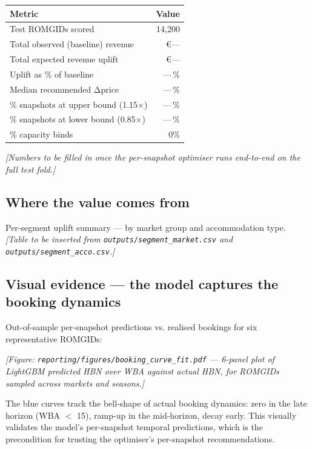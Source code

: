 \documentclass[11pt,a4paper]{article}
\begin{document}
\begin{center}
\small
\begin{tabular}{@{}lr@{}}
\toprule
\textbf{Metric} & \textbf{Value} \\
\midrule
Test ROMGIDs scored & 14{,}200 \\
Total observed (baseline) revenue & \euro{}--- \\
Total expected revenue uplift & \euro{}--- \\
Uplift as \% of baseline & ---\,\% \\
Median recommended Δprice & ---\,\% \\
\% snapshots at upper bound (1.15$\times$) & ---\,\% \\
\% snapshots at lower bound (0.85$\times$) & ---\,\% \\
\% capacity binds & 0\% \\
\bottomrule
\end{tabular}
\end{center}

\noindent\emph{[Numbers to be filled in once the per-snapshot optimiser runs end-to-end on the full test fold.]}

\subsection{Where the value comes from}

Per-segment uplift summary --- by market group and accommodation type. \emph{[Table to be inserted from \texttt{outputs/segment\_market.csv} and \texttt{outputs/segment\_acco.csv}.]}

\subsection{Visual evidence — the model captures the booking dynamics}

Out-of-sample per-snapshot predictions vs. realised bookings for six representative ROMGIDs:

\begin{center}
  \emph{[Figure: \texttt{reporting/figures/booking\_curve\_fit.pdf} --- 6-panel plot of LightGBM predicted HBN over WBA against actual HBN, for ROMGIDs sampled across markets and seasons.]}
\end{center}

\noindent The blue curves track the bell-shape of actual booking dynamics: zero in the late horizon (WBA $<$ 15), ramp-up in the mid-horizon, decay early. This visually validates the model's per-snapshot temporal predictions, which is the precondition for trusting the optimiser's per-snapshot recommendations.
\end{document}
